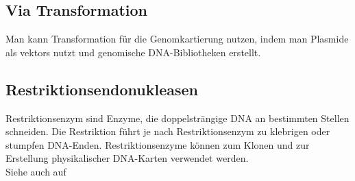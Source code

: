  

\subsection{Via Transformation}
Man kann Transformation für die Genomkartierung nutzen, indem man Plasmide als \glspl{vektor} nutzt und genomische DNA-Bibliotheken erstellt.  

\subsection{Restriktionsendonukleasen}  \label{sec:Restriktionsendonuklease}
Restriktionsenzym sind Enzyme, die doppelsträngige DNA an bestimmten Stellen schneiden. Die Restriktion führt je nach Restriktionsenzym zu klebrigen oder stumpfen DNA-Enden. Restriktionsenzyme können zum Klonen und zur Erstellung physikalischer DNA-Karten verwendet werden. \\ 
Siehe auch  auf \pageref{sec:Restriktionskartierung}


